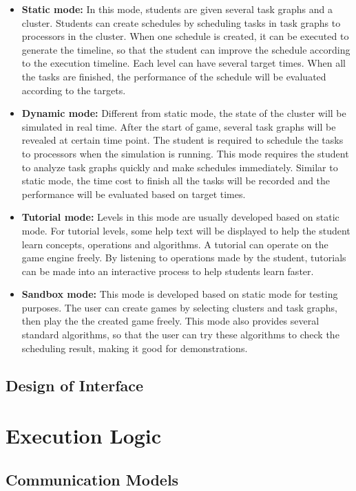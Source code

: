 \documentclass[msc,deptreport, cs]{infthesis}
\begin{document}
\begin{itemize}
  \item \textbf{Static mode:} In this mode, students are given several task graphs and a cluster. Students can create schedules by scheduling tasks in task graphs to processors in the cluster. When one schedule is created, it can be executed to generate the timeline, so that the student can improve the schedule according to the execution timeline. Each level can have several target times. When all the tasks are finished, the performance of the schedule will be evaluated according to the targets.
  \item \textbf{Dynamic mode:} Different from static mode, the state of the cluster will be simulated in real time. After the start of game, several task graphs will be revealed at certain time point. The student is required to schedule the tasks to processors when the simulation is running. This mode requires the student to analyze task graphs quickly and make schedules immediately. Similar to static mode, the time cost to finish all the tasks will be recorded and the performance will be evaluated based on target times.
  \item \textbf{Tutorial mode:} Levels in this mode are usually developed based on static mode. For tutorial levels, some help text will be displayed to help the student learn concepts, operations and algorithms. A tutorial can operate on the game engine freely. By listening to operations made by the student, tutorials can be made into an interactive process to help students learn faster.
  \item \textbf{Sandbox mode:} This mode is developed based on static mode for testing purposes. The user can create games by selecting clusters and task graphs, then play the the created game freely. This mode also provides several standard algorithms, so that the user can try these algorithms to check the scheduling result, making it good for demonstrations.
\end{itemize}

\subsection{Design of Interface}

\section{Execution Logic}

\subsection{Communication Models}
\end{document}

